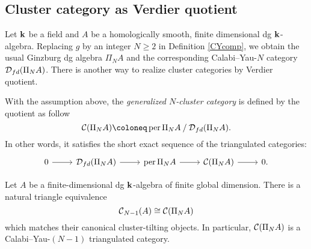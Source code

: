 \subsection{Cluster category as Verdier quotient}
Let $\mathbf{k}$ be a field and $A$ be a homologically smooth,
finite dimensional dg $\mathbf{k}$-algebra.
Replacing $g$ by an integer $N \geq 2$ in Definition \ref{CYcomp},
we obtain the usual Ginzburg dg algebra $\Pi_NA$
and the corresponding Calabi--Yau-$N$ category $\operatorname{\mathcal{D}}_{fd}(\Pi_NA)$.
There is another way to realize cluster categories by Verdier quotient.
\begin{definition}
  With the assumption above, the \textit{generalized $N$-cluster category}
  is defined by the quotient as follow
  \[ \Ce(\Pi_NA) \coloneq \per \Pi_N A \quot \D_{fd}(\Pi_N A). \]
  In other words,
  it satisfies the short exact sequence of the triangulated categories:
  \[
    \begin{tikzcd}
      0 \ar[r] & \D_{fd}(\Pi_N A) \ar[r] & \per \Pi_N A \ar[r]
               & \Ce(\Pi_N A) \ar[r] & 0.
    \end{tikzcd}
  \]
\end{definition}

\begin{theorem}\cite{A, Guo, K2}
  Let $A$ be a finite-dimensional dg $\mathbf{k}$-algebra of finite global dimension.
  There is a natural triangle equivalence
  \[ \operatorname{\mathcal{C}}_{N-1}(A) \cong \operatorname{\mathcal{C}}(\Pi_N A) \]
  which matches their canonical cluster-tilting objects.
  In particular, $\operatorname{\mathcal{C}}(\Pi_N A)$ is a Calabi--Yau-$(N-1)$ triangulated category.
\end{theorem}

